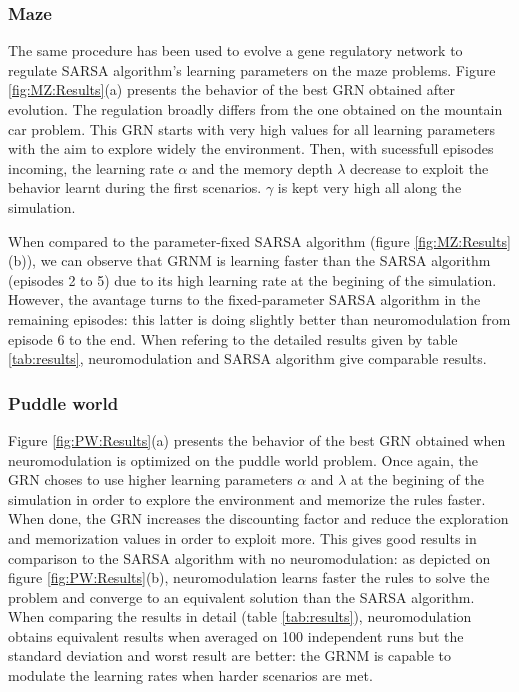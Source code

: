\subsubsection{Maze}
The same procedure has been used to evolve a gene regulatory network to regulate SARSA algorithm's learning parameters on the maze problems. Figure \ref{fig:MZ:Results}(a) presents the behavior of the best GRN obtained after evolution. The regulation broadly differs from the one obtained on the mountain car problem. This GRN starts with very high values for all learning parameters with the aim to explore widely the environment. Then, with sucessfull episodes incoming, the learning rate $\alpha$ and the memory depth $\lambda$ decrease to exploit the behavior learnt during the first scenarios. $\gamma$ is kept very high all along the simulation.

When compared to the parameter-fixed SARSA algorithm (figure \ref{fig:MZ:Results}(b)), we can observe that GRNM is learning faster than the SARSA algorithm (episodes 2 to 5) due to its high learning rate at the begining of the simulation. However, the avantage turns to the fixed-parameter SARSA algorithm in the remaining episodes: this latter is doing slightly better than neuromodulation from episode 6 to the end. When refering to the detailed results given by table \ref{tab:results}, neuromodulation and SARSA algorithm give comparable results. 

\subsubsection{Puddle world}
Figure \ref{fig:PW:Results}(a) presents the behavior of the best GRN obtained when neuromodulation is optimized on the puddle world problem. Once again, the GRN choses to use higher learning parameters $\alpha$ and $\lambda$ at the begining of the simulation in order to explore the environment and memorize the rules faster. When done, the GRN increases the discounting factor and reduce the exploration and memorization values in order to exploit more. This gives good results in comparison to the SARSA algorithm with no neuromodulation: as depicted on figure \ref{fig:PW:Results}(b), neuromodulation learns faster the rules to solve the problem and converge to an equivalent solution than the SARSA algorithm. When comparing the results in detail (table \ref{tab:results}), neuromodulation obtains equivalent results when averaged on 100 independent runs but the standard deviation and worst result are better: the GRNM is capable to modulate the learning rates when harder scenarios are met. 

